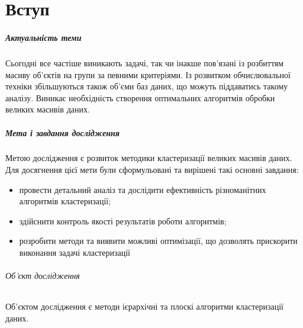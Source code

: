 \chapter*{Вступ}

\paragraph{Актуальність теми}

Сьогодні все частіше виникають задачі, так чи інакше пов'язані із розбиттям масиву об'єктів на групи за певними критеріями. Із розвитком обчислювальної техніки збільшуються також об'єми баз даних, що можуть піддаватись такому аналізу. Виникає необхідність створення оптимальних алгоритмів обробки великих масивів даних.

\paragraph{Мета і завдання дослідження}

Метою дослідження є розвиток методики кластеризації великих масивів даних.
Для досягнення цієї мети були сформульовані та вирішені такі основні завдання:
\begin{itemize}
    \item провести детальний аналіз та дослідити ефективність різноманітних алгоритмів кластеризації;
    \item здійснити контроль якості результатів роботи алгоритмів;
    \item розробити методи та виявити можливі оптимізації, що дозволять прискорити виконання задачі кластеризації
\end{itemize}

\subparagraph{Об'єкт дослідження}
Об'єктом дослідження є методи ієрархічні та плоскі алгоритми кластеризації даних.
